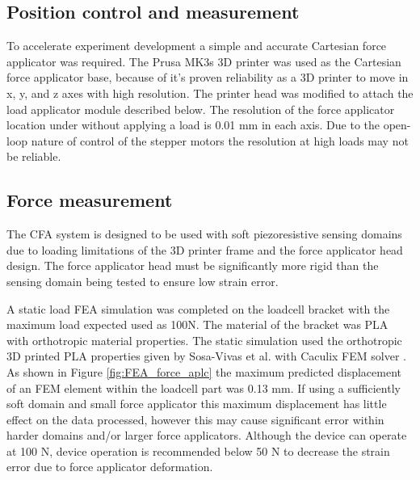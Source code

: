 \subsection{Position control and measurement}
To accelerate experiment development a simple and accurate Cartesian force applicator was required. The Prusa MK3s 3D printer was used as the Cartesian force applicator base, because of it's proven reliability as a 3D printer to move in x, y, and z axes with high resolution. The printer head was modified to attach the load applicator module described below. The resolution of the force applicator location under without applying a load is 0.01 mm in each axis. Due to the open-loop nature of control of the stepper motors the resolution at high loads may not be reliable.


\subsection{Force measurement}
The CFA system is designed to be used with soft piezoresistive sensing domains due to loading limitations of the 3D printer frame and the force applicator head design. The force applicator head must be significantly more rigid than the sensing domain being tested to ensure low strain error. 

A static load FEA simulation was completed on the loadcell bracket with the maximum load expected used as 100N. The material of the bracket was PLA with orthotropic material properties. The static simulation used the orthotropic 3D printed PLA properties given by Sosa-Vivas et al. \cite{SosaVivas2023} with Caculix FEM solver \cite{Dhondt2023}. As shown in Figure \ref{fig:FEA_force_aplc} the maximum predicted displacement of an FEM element within the loadcell part was 0.13 mm. If using a sufficiently soft domain and small force applicator this maximum displacement has little effect on the data processed, however this may cause significant error within harder domains and/or larger force applicators. Although the device can operate at 100 N, device operation is recommended below 50 N to decrease the strain error due to force applicator deformation.

